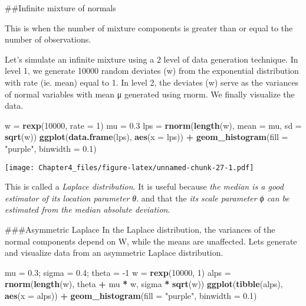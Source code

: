 \documentclass[]{article}
\newenvironment{Shaded}{\begin{snugshade}}{\end{snugshade}}
\newcommand{\DataTypeTok}[1]{\textcolor[rgb]{0.13,0.29,0.53}{#1}}
\newcommand{\DecValTok}[1]{\textcolor[rgb]{0.00,0.00,0.81}{#1}}
\newcommand{\FloatTok}[1]{\textcolor[rgb]{0.00,0.00,0.81}{#1}}
\newcommand{\KeywordTok}[1]{\textcolor[rgb]{0.13,0.29,0.53}{\textbf{#1}}}
\newcommand{\NormalTok}[1]{#1}
\newcommand{\OperatorTok}[1]{\textcolor[rgb]{0.81,0.36,0.00}{\textbf{#1}}}
\newcommand{\StringTok}[1]{\textcolor[rgb]{0.31,0.60,0.02}{#1}}
\begin{document}
\#\#Infinite mixture of normals

This is when the number of mixture components is greater than or equal
to the number of observations.

Let's simulate an infinite mixture using a 2 level of data generation
technique. In level 1, we generate 10000 random deviates (w) from the
exponential distribution with rate (ie. mean) equal to 1. In level 2,
the deviates (w) serve as the variances of normal variables with mean μ
generated using rnorm. We finally visualize the data.

\begin{Shaded}
\begin{Highlighting}[]
\NormalTok{w =}\StringTok{ }\KeywordTok{rexp}\NormalTok{(}\DecValTok{10000}\NormalTok{, }\DataTypeTok{rate =} \DecValTok{1}\NormalTok{)}
\NormalTok{mu  =}\StringTok{ }\FloatTok{0.3}
\NormalTok{lps =}\StringTok{ }\KeywordTok{rnorm}\NormalTok{(}\KeywordTok{length}\NormalTok{(w), }\DataTypeTok{mean =}\NormalTok{ mu, }\DataTypeTok{sd =} \KeywordTok{sqrt}\NormalTok{(w))}
\KeywordTok{ggplot}\NormalTok{(}\KeywordTok{data.frame}\NormalTok{(lps), }\KeywordTok{aes}\NormalTok{(}\DataTypeTok{x =}\NormalTok{ lps)) }\OperatorTok{+}
\StringTok{  }\KeywordTok{geom_histogram}\NormalTok{(}\DataTypeTok{fill =} \StringTok{"purple"}\NormalTok{, }\DataTypeTok{binwidth =} \FloatTok{0.1}\NormalTok{)}
\end{Highlighting}
\end{Shaded}

\texttt{[image: Chapter4\_files/figure-latex/unnamed-chunk-27-1.pdf]}

This is called a \emph{Laplace distribution}. It is useful because
\emph{the median is a good estimator of its location parameter θ}. and
that the \emph{its scale parameter ϕ can be estimated from the median
absolute deviation}.

\#\#\#Asymmetric Laplace In the Laplace distribution, the variances of
the normal components depend on W, while the means are unaffected. Lets
generate and visualize data from an asymmetric Laplace distribution.

\begin{Shaded}
\begin{Highlighting}[]
\NormalTok{mu =}\StringTok{ }\FloatTok{0.3}\NormalTok{; sigma =}\StringTok{ }\FloatTok{0.4}\NormalTok{; theta =}\StringTok{ }\DecValTok{-1}
\NormalTok{w  =}\StringTok{ }\KeywordTok{rexp}\NormalTok{(}\DecValTok{10000}\NormalTok{, }\DecValTok{1}\NormalTok{)}
\NormalTok{alps =}\StringTok{ }\KeywordTok{rnorm}\NormalTok{(}\KeywordTok{length}\NormalTok{(w), theta }\OperatorTok{+}\StringTok{ }\NormalTok{mu }\OperatorTok{*}\StringTok{ }\NormalTok{w, sigma }\OperatorTok{*}\StringTok{ }\KeywordTok{sqrt}\NormalTok{(w))}
\KeywordTok{ggplot}\NormalTok{(}\KeywordTok{tibble}\NormalTok{(alps), }\KeywordTok{aes}\NormalTok{(}\DataTypeTok{x =}\NormalTok{ alps)) }\OperatorTok{+}
\StringTok{  }\KeywordTok{geom_histogram}\NormalTok{(}\DataTypeTok{fill =} \StringTok{"purple"}\NormalTok{, }\DataTypeTok{binwidth =} \FloatTok{0.1}\NormalTok{)}
\end{Highlighting}
\end{Shaded}
\end{document}
